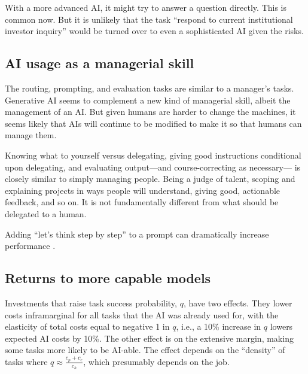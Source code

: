 \documentclass{article}
\begin{document}
With a more advanced AI, it might try to answer a question directly.
This is common now. 
But it is unlikely that the task ``respond to current institutional investor inquiry'' would be turned over to even a sophisticated AI given the risks.

\subsection{AI usage as a managerial skill}
The routing, prompting, and evaluation tasks are similar to a manager's tasks.
Generative AI seems to complement a new kind of managerial skill, albeit the management of an AI. 
But given humans are harder to change the machines, it seems likely that AIs will continue to be modified to make it so that humans can manage them. 

Knowing what to yourself versus delegating, giving good instructions conditional upon delegating, and evaluating output---and course-correcting as necessary--- is closely similar to simply managing people.
Being a judge of talent, scoping and explaining projects in ways people will understand, giving good, actionable feedback, and so on. 
It is not fundamentally different from what should be delegated to a human. 

Adding ``let's think step by step'' to a prompt can dramatically increase performance \citep{kojima2023large}.


\subsection{Returns to more capable models}
Investments that raise task success probability, $q$, have two effects. 
They lower costs inframarginal for all tasks that the AI was already used for, with the elasticity of total costs equal to negative 1 in $q$, i.e., a 10\% increase in $q$ lowers expected AI costs by 10\%. 
The other effect is on the extensive margin, making some tasks more likely to be AI-able. 
The effect depends on the ``density'' of tasks where $q \approx \frac{c_p + c_e}{c_h}$, which presumably depends on the job.
\end{document}

